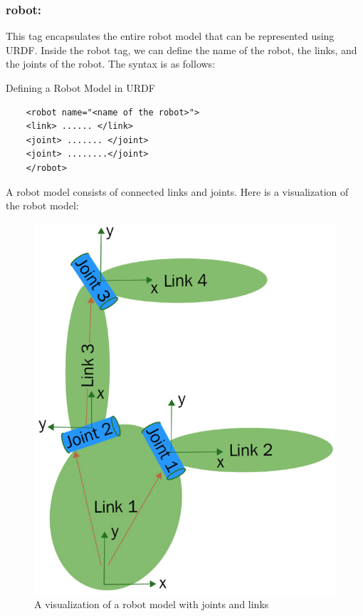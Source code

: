 \documentclass[../../main]{subfiles}
\begin{document}
\subsubsection{robot:}
This tag encapsulates the entire robot model that can be represented using
URDF. Inside the robot tag, we can define the name of the robot, the links, and the
joints of the robot.
The syntax is as follows:

\begin{codebox}[]{Defining a Robot Model in URDF}
  \begin{verbatim}
    <robot name="<name of the robot>">
    <link> ...... </link>
    <joint> ....... </joint>
    <joint> ........</joint>
    </robot>
\end{verbatim}
  \end{codebox}
A robot model consists of connected links and joints. Here is a visualization of the
robot model:
\begin{figure}[ht]
    \centering
    \includegraphics{sublatex/hashem/img/robot1.jpg}
    \caption{A visualization of a robot model with joints and links\cite{joseph2018mastering}}
\end{figure}
\end{document}
